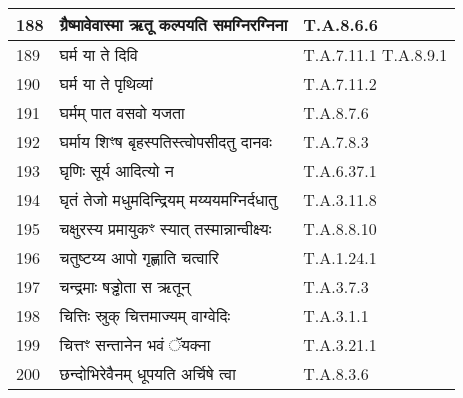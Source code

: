\documentclass[17pt]{extarticle}
\begin{document}
\begin{longtable}{||p{0.4in}||p{4.9in}||p{0.9in}||}
    \hline
        
    188 & ग्रैष्मावेवास्मा ऋतू कल्पयति समग्निरग्निना & T.A.8.6.6       \\
    
    \hline
        
    189 & घर्म या ते दिवि & T.A.7.11.1 T.A.8.9.1       \\
    
    \hline
        
    190 & घर्म या ते पृथिव्यां & T.A.7.11.2       \\
    
    \hline
        
    191 & घर्मम् पात वसवो यजता & T.A.8.7.6       \\
    
    \hline
        
    192 & घर्माय शिꣳष बृहस्पतिस्त्वोपसीदतु दानवः & T.A.7.8.3       \\
    
    \hline
        
    193 & घृणिः सूर्य आदित्यो न & T.A.6.37.1       \\
    
    \hline
        
    194 & घृतं तेजो मधुमदिन्द्रियम् मय्ययमग्निर्दधातु & T.A.3.11.8       \\
    
    \hline
        
    195 & चक्षुरस्य प्रमायुकꣳ स्यात् तस्मान्नान्वीक्ष्यः & T.A.8.8.10       \\
    
    \hline
        
    196 & चतुष्टय्य आपो गृह्णाति चत्वारि & T.A.1.24.1       \\
    
    \hline
        
    197 & चन्द्रमाः षड्ढोता स ऋतून् & T.A.3.7.3       \\
    
    \hline
        
    198 & चित्तिः स्रुक् चित्तमाज्यम् वाग्वेदिः & T.A.3.1.1       \\
    
    \hline
        
    199 & चित्तꣳ सन्तानेन भवं ॅयक्ना & T.A.3.21.1       \\
    
    \hline
        
    200 & छन्दोभिरेवैनम् धूपयति अर्चिषे त्वा & T.A.8.3.6       \\
    

\end{longtable}
\end{document}
